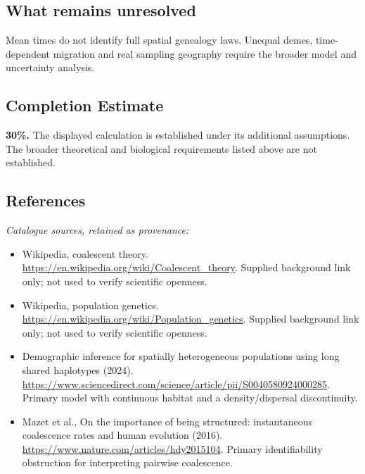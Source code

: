 \documentclass[11pt]{article}
\begin{document}
\subsection{What remains unresolved}
Mean times do not identify full spatial genealogy laws. Unequal demes, time-dependent migration and real sampling geography require the broader model and uncertainty analysis.
\subsection{Completion Estimate}
\textbf{30\%.} The displayed calculation is established under its additional assumptions. The broader theoretical and biological requirements listed above are not established.
\subsection{References}
\noindent\emph{Catalogue sources, retained as provenance:}
\begin{itemize}
\item Wikipedia, coalescent theory. \url{https://en.wikipedia.org/wiki/Coalescent_theory}. Supplied background link only; not used to verify scientific openness.
\item Wikipedia, population genetics. \url{https://en.wikipedia.org/wiki/Population_genetics}. Supplied background link only; not used to verify scientific openness.
\item Demographic inference for spatially heterogeneous populations using long shared haplotypes (2024). \url{https://www.sciencedirect.com/science/article/pii/S0040580924000285}. Primary model with continuous habitat and a density/dispersal discontinuity.
\item Mazet et al., On the importance of being structured: instantaneous coalescence rates and human evolution (2016). \url{https://www.nature.com/articles/hdy2015104}. Primary identifiability obstruction for interpreting pairwise coalescence.
\end{itemize}
\end{document}
